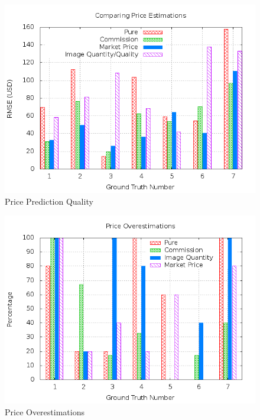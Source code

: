\begin{figure}
\centering
\includegraphics[scale=0.55]{images/plots/crowdsourcing/plot_price_rmse.png}
\caption{Price Prediction Quality}
\label{crowdsourcing_price_pred}
\end{figure}
\begin{figure}
\centering
\includegraphics[scale=0.55]{images/plots/crowdsourcing/plot_price_overestimation.png}
\caption{Price Overestimations}
\label{crowdsourcing_price_overestimations}
\end{figure}

